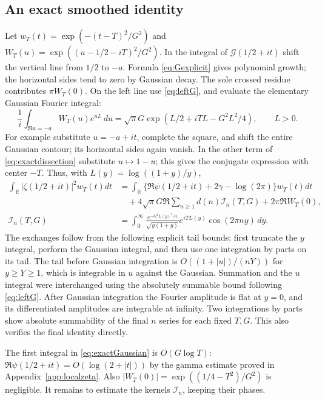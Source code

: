 \subsection{An exact smoothed identity}
Let $w_T(t)=\exp(-(t-T)^2/G^2)$ and
$W_T(u)=\exp((u-1/2-iT)^2/G^2)$.
In the integral of $\mathcal G(1/2+it)$ shift the vertical line from
$1/2$ to $-a$. Formula \eqref{eq:Gexplicit} gives polynomial growth;
the horizontal sides tend to zero by Gaussian decay. The sole crossed
residue contributes $\pi W_T(0)$. On the left line use
\eqref{eq:leftG}, and evaluate the elementary Gaussian Fourier integral:
\[
 \frac1i\int_{\Re u=-a}W_T(u)e^{uL}\,du
   =\sqrt\pi G\exp(L/2+iTL-G^2L^2/4),\qquad L>0.
\]
For example substitute $u=-a+it$, complete the square, and shift the
entire Gaussian contour; its horizontal sides again vanish.
In the other term of \eqref{eq:exactdissection} substitute $u\mapsto1-u$;
this gives the conjugate expression with center $-T$.
Thus, with $L(y)=\log((1+y)/y)$,
\begin{equation}\label{eq:exactGaussian}
\begin{split}
 \int_{\mathbb R}|\zeta(1/2+it)|^2w_T(t)dt
 &=\int_{\mathbb R}
   \{\Re\psi(1/2+it)+2\gamma-\log(2\pi)\}w_T(t)dt\\
 &\quad+4\sqrt\pi G\Re\sum_{n\ge1}d(n)\mathcal I_n(T,G)
       +2\pi\Re W_T(0),\\
 \mathcal I_n(T,G)&=\int_0^\infty
 \frac{e^{-G^2L(y)^2/4}}{\sqrt{y(1+y)}}e^{iTL(y)}
                                    \cos(2\pi ny)\,dy.
\end{split}
\end{equation}
The exchanges follow from the following explicit tail bounds:
first truncate the $y$ integral, perform the Gaussian integral, and
then use one integration by parts on its tail. The tail before
Gaussian integration is $O((1+|u|)/(nY))$ for $y\ge Y\ge1$,
which is integrable in $u$ against the Gaussian. Summation and the
$u$ integral were interchanged using the absolutely summable
bound following \eqref{eq:leftG}.
After Gaussian integration the Fourier amplitude is flat at $y=0$,
and its differentiated amplitudes are integrable at infinity. Two
integrations by parts show absolute summability of the final $n$ series
for each fixed $T,G$. This also verifies the final identity directly.

The first integral in \eqref{eq:exactGaussian} is $O(G\log T)$:
$\Re\psi(1/2+it)=O(\log(2+|t|))$ by the gamma estimate
proved in Appendix~\ref{app:localzeta}. Also
$|W_T(0)|=\exp((1/4-T^2)/G^2)$ is negligible.
It remains to estimate the kernels $\mathcal I_n$, keeping their phases.

